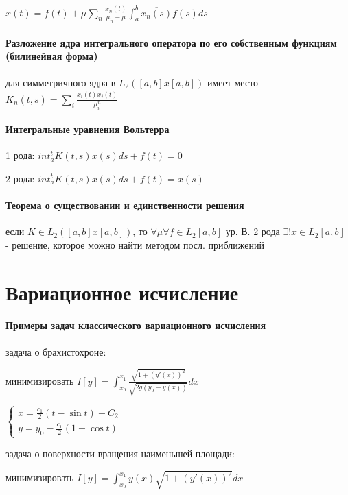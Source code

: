 \documentclass[russian,twocolumn]{article}
\begin{document}
$x(t) = f(t) + \mu \sum _n \frac{x_n(t)}{\mu_n - \mu} \int _a^b \overline{x_n(s)}f(s) ds$

\paragraph{Разложение ядра интегрального оператора по его собственным функциям (билинейная форма)}

для симметричного ядра в $L_2([a,b]x[a,b])$ имеет место $K_n(t,s) = \sum_i\frac{x_i(t)\overline{x_j(t)}}{\mu_i^n}$

\paragraph{Интегральные уравнения Вольтерра}

1 рода: $int_a^t K(t,s)x(s) ds + f(t) = 0$

2 рода: $int_a^t K(t,s)x(s) ds + f(t) = x(s)$

\paragraph{Теорема о существовании и единственности решения}

если $K \in L_2([a,b]x[a,b])$, то $\forall \mu \forall f \in L_2[a,b]$ ур. В. 2 рода $\exists!x\in L_2[a,b]$ - решение, которое можно найти методом посл. приближений

\section{Вариационное исчисление}

\paragraph{Примеры задач классического вариационного исчисления}

задача о брахистохроне:

минимизировать $I[y]=\int_{x_0}^{x_1}\frac{\sqrt{1+(y'(x))^2}}{\sqrt{2g(y_0-y(x))}}dx$

$\begin{cases}
x=\frac{c_1}{2}(t-\sin t) + C_2 \\
y = y_0 - \frac{c_1}{2}(1 - \cos t)
\end{cases}$

задача о поверхности вращения наименьшей площади:

минимизировать $I[y]=\int_{x_0}^{x_1}y(x)\sqrt{1+(y'(x))^2}dx$
\end{document}
